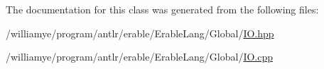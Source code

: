 The documentation for this class was generated from the following files\+:\begin{DoxyCompactItemize}
\item 
/williamye/program/antlr/erable/\+Erable\+Lang/\+Global/\mbox{\hyperlink{_i_o_8hpp}{I\+O.\+hpp}}\item 
/williamye/program/antlr/erable/\+Erable\+Lang/\+Global/\mbox{\hyperlink{_i_o_8cpp}{I\+O.\+cpp}}\end{DoxyCompactItemize}
